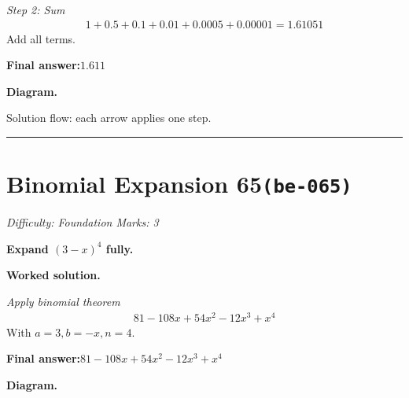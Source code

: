 \documentclass[11pt]{article}
\newcommand{\question}[1]{\par\medskip\noindent\textbf{#1}\par}
\begin{document}
\textit{Step 2: Sum}
\[\begin{gathered}
1 + 0.5 + 0.1 + 0.01 + 0.0005 + 0.00001 = 1.61051
\end{gathered}\]
Add all terms.

\begin{answerbox}
\textbf{Final answer:}\quad \(\displaystyle 1.611\)
\end{answerbox}
\textbf{Diagram.}

\begin{center}
\end{center}
\small Solution flow: each arrow applies one step.\normalsize

\medskip\hrule

\section*{Binomial Expansion 65\quad\small\texttt{(be-065)}}
\textit{Difficulty: Foundation \quad\textbar\quad Marks: 3}

\question{Expand \( (3 - x)^4 \) fully.}

\textbf{Worked solution.}

\textit{Apply binomial theorem}
\[\begin{gathered}
81 - 108x + 54x^2 - 12x^3 + x^4
\end{gathered}\]
With \( a=3, b=-x, n=4 \).

\begin{answerbox}
\textbf{Final answer:}\quad \(\displaystyle 81 - 108x + 54x^2 - 12x^3 + x^4\)
\end{answerbox}
\textbf{Diagram.}
\end{document}
